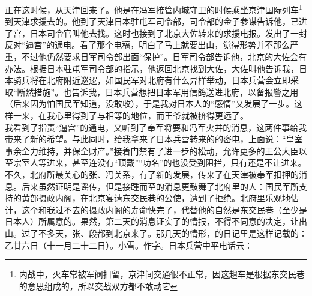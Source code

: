 正在这时候，从天津回来了。他是在冯军接管内城守卫的时候乘坐京津国际列车\footnote{内战中，火车常被军阀扣留，京津间交通很不正常，因这趟车是根据东交民巷的意思组成的，所以交战双方都不敢动它}到天津求援去的。他到了天津日本驻屯军司令部，司令部的金子参谋告诉他，已进了宫，日本司令官叫他去找。这时也接到了北京大佐转来的求援电报。发出了一封反对“逼宫”的通电。看了那个电稿，明白了马上就要出山，觉得形势并不那么严重，不过他仍然要求日军司令部出面“保护”。日军司令部告诉他，北京的大佐会有办法。根据日本驻屯军司令部的指示，他返回北京找到大佐，大佐叫他告诉我，日本骑兵将在北府附近巡逻，如国民军对北府有什么异样举动，日本兵营会立即采取“断然措施”。也告诉我，日本兵营想把日本军用信鸽送进北府，以备报警之用（后来因为怕国民军知道，没敢收），于是我对日本人的“感情”又发展了一步。这样一来，在我心里得到了与相等的地位，而王爷就被挤得更远了。\\

我看到了指责“逼宫”的通电，又听到了奉军将要和冯军火并的消息，这两件事给我带来了新的希望。与此同时，给我拿来了日本兵营转来的的密电，上面说：“皇室事余全力维持，并保全财产。”接着门禁有了进一步的松动，允许更多的王公大臣以至宗室人等进来，甚至连没有“顶戴”“功名”的也没受到阻拦，只有还是不让进来。\\

不久，北府所最关心的张、冯关系，有了新的发展，传来了在天津被奉军扣押的消息。后来虽然证明是谣传，但是接踵而至的消息更鼓舞了北府里的人：国民军所支持的黄部摄政内阁，在北京宴请东交民巷的公使，遭到了拒绝。北府里乐观地估计，这个和我过不去的摄政内阁的寿命快完了，代替他的自然是东交民巷（至少是日本人）所属意的。果然，第二天的消息证实了的情报，不得不同意的决定，让出山。过了不多天，张、段都到北京来了。那几天的情形，的日记里是这样记载的：\\

乙廿六日（十一月二十二日）。小雪。作字。日本兵营中平电话云：\\

